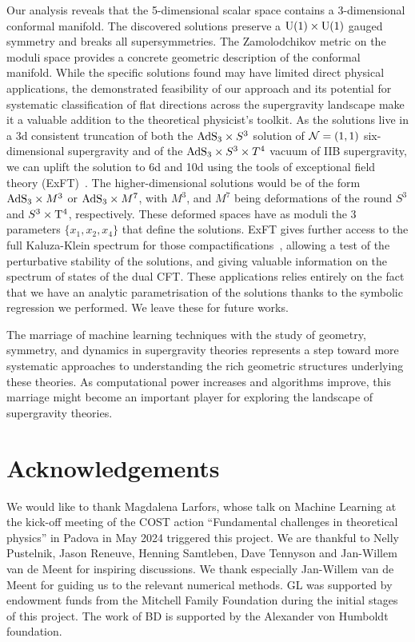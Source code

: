 \documentclass[11pt,a4paper]{article}
\begin{document}
Our analysis reveals that the 5-dimensional scalar space contains a 3-dimensional conformal manifold. The discovered solutions preserve a ${\rm U}(1) \times {\rm U}(1)$ gauged symmetry and breaks all supersymmetries. The Zamolodchikov metric on the moduli space provides a concrete geometric description of the conformal manifold. While the specific solutions found may have limited direct physical applications, the demonstrated feasibility of our approach and its potential for systematic classification of flat directions across the supergravity landscape make it a valuable addition to the theoretical physicist's toolkit. As the solutions live in a 3d consistent truncation of both the ${\rm AdS}_3 \times S^3$ solution of ${\cal N}=(1,1)$ six-dimensional supergravity and of the ${\rm AdS}_3 \times S^3 \times T^4$ vacuum of IIB supergravity, we can uplift the solution to 6d and 10d using the tools of exceptional field theory (ExFT)~\cite{Hohm:2014fxa,Hohm:2014qga,Hohm:2017wtr}. The higher-dimensional solutions would be of the form ${\rm AdS}_3 \times M^3$ or ${\rm AdS}_3 \times M^7$, with $M^{3}$, and $M^{7}$ being deformations of the round $S^{3}$ and $S^{3}\times {\rm T}^{4}$, respectively. These deformed spaces have as moduli the 3 parameters $\{x_{1},x_{2},x_{4}\}$ that define the solutions. ExFT gives further access to the full Kaluza-Klein spectrum for those compactifications~\cite{Malek:2019eaz,Malek:2020yue,Eloy:2020uix}, allowing a test of the perturbative stability of the solutions, and giving valuable information on the spectrum of states of the dual CFT. These applications relies entirely on the fact that we have an analytic parametrisation of the solutions thanks to the symbolic regression we performed. We leave these for future works.

The marriage of machine learning techniques with the study of geometry, symmetry, and dynamics in supergravity theories represents a step toward more systematic approaches to understanding the rich geometric structures underlying these theories. As computational power increases and algorithms improve, this marriage might become an important player for exploring the landscape of supergravity theories.

\section*{Acknowledgements}
We would like to thank Magdalena Larfors, whose talk on Machine Learning at the kick-off meeting of the COST action ``Fundamental challenges in theoretical physics'' in Padova in May 2024 triggered this project. We are thankful to Nelly Pustelnik, Jason Reneuve, Henning Samtleben, Dave Tennyson and Jan-Willem van de Meent for inspiring discussions. We thank especially Jan-Willem van de Meent for guiding us to the relevant numerical methods. GL was supported by endowment funds from the Mitchell Family Foundation during the initial stages of this project. The work of BD is supported by the Alexander von Humboldt foundation.
\end{document}
